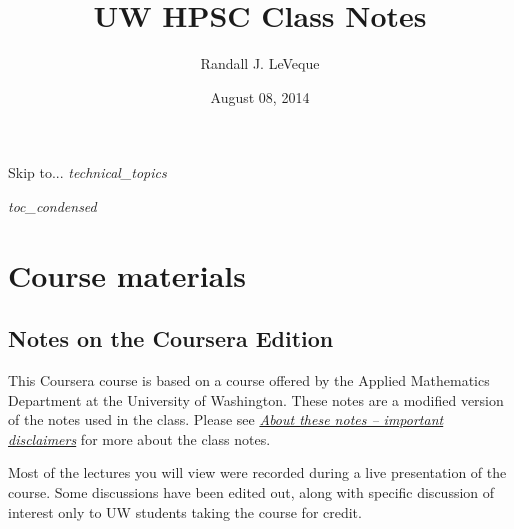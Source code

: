 \documentclass[letterpaper,10pt,english]{sphinxmanual}
\title{UW HPSC Class Notes}
\date{August 08, 2014}
\author{Randall J. LeVeque}
\begin{document}
\maketitle
\tableofcontents
{}\label{index::doc}


Skip to... \emph{technical\_topics}

\emph{toc\_condensed}


\chapter{Course materials}
\label{index:course-materials}\label{index:contents-of-class-notes-for-uw-hpsc-coursera-edition}\label{index:id1}

\section{Notes on the Coursera Edition}
\label{coursera:coursera}\label{coursera:notes-on-the-coursera-edition}\label{coursera::doc}
This Coursera course is based on a course offered by the Applied Mathematics
Department at the  University of Washington.
These notes are a modified version of the notes
used in the class.  Please see {\hyperref[about:about]{\emph{About these notes -- important disclaimers}}} for more about the class notes.

Most of the lectures you will view were recorded during a live presentation
of the course.  Some discussions have been edited out, along with specific
discussion of interest only to UW students taking the course for credit.
\end{document}

